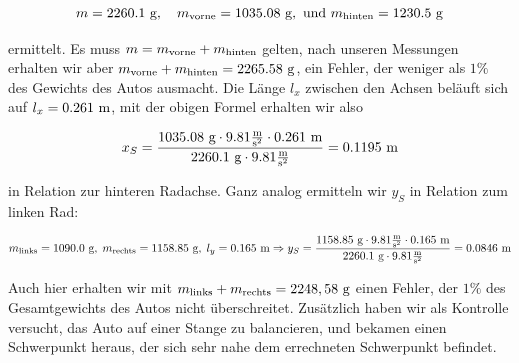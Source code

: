 $$ m = 2260.1 {\textnormal{ g}},\quad m_{\textnormal{vorne}} = 1035.08{\textnormal{ g}}, \textnormal{ und } m_{\textnormal{hinten}} = 1230.5{\textnormal{ g}}$$

ermittelt. Es muss $m = m_{\textnormal{vorne}} + m_{\textnormal{hinten}}$ gelten, nach unseren Messungen erhalten wir aber $m_{\textnormal{vorne}} + m_{\textnormal{hinten}} = 2265.58 {\textnormal{ g}}$, ein Fehler, der weniger als $1\%$ des Gewichts des Autos ausmacht.
Die Länge $l_x$ zwischen den Achsen beläuft sich auf $l_x = 0.261 {\textnormal{ m}}$, mit der obigen Formel erhalten wir also 

$$x_S = \frac{1035.08 {\textnormal{ g}}\cdot 9.81 \frac{\textnormal{m}}{\textnormal{s}^2} \cdot 0.261 {\textnormal{ m}}}{2260.1 {\textnormal{ g}} \cdot 9.81 \frac{\textnormal{m}}{\textnormal{s}^2} } = 0.1195 {\textnormal{ m}} $$

in Relation zur hinteren Radachse. Ganz analog ermitteln wir $y_S$ in Relation zum linken Rad:

$$ m_{\textnormal{links}} = 1090.0 {\textnormal{ g}}, \; m_{\textnormal{rechts}} = 1158.85 {\textnormal{ g}},\; l_y = 0.165 {\textnormal{ m}} 
 \Rightarrow y_S = \frac{1158.85 {\textnormal{ g}} \cdot 9.81 \frac{\textnormal{m}}{\textnormal{s}^2} \cdot 0.165 {\textnormal{ m}}}{2260.1 {\textnormal{ g}} \cdot 9.81 \frac{\textnormal{m}}{\textnormal{s}^2} } = 0.0846 {\textnormal{ m}}$$

Auch hier erhalten wir mit $m_{\textnormal{links}} + m_{\textnormal{rechts}} = 2248,58 {\textnormal{ g}}$ einen Fehler, der $1\%$ des Gesamtgewichts des Autos nicht überschreitet. Zusätzlich haben wir als Kontrolle versucht, das Auto auf einer Stange zu balancieren, und bekamen einen Schwerpunkt heraus, der sich sehr nahe dem errechneten Schwerpunkt befindet.
